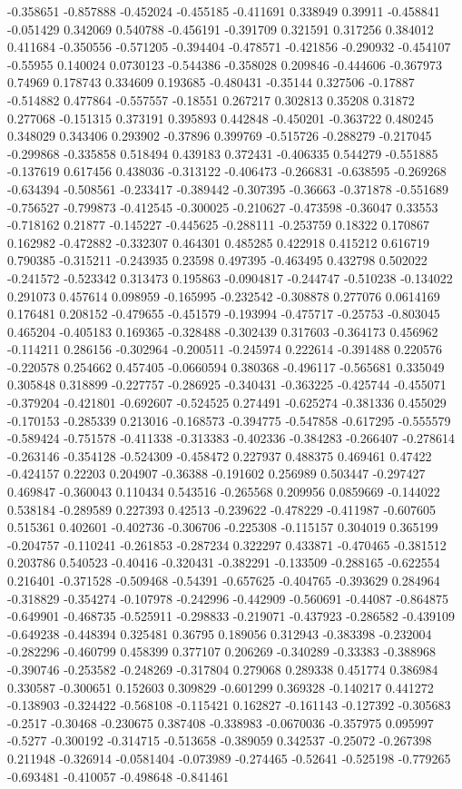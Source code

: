 -0.358651 -0.857888 -0.452024 -0.455185 -0.411691 0.338949 0.39911 -0.458841 -0.051429 0.342069 0.540788 -0.456191 -0.391709 0.321591 0.317256 0.384012 0.411684 -0.350556 -0.571205 -0.394404 -0.478571 -0.421856 -0.290932 -0.454107 -0.55955 0.140024 0.0730123 -0.544386 -0.358028 0.209846 -0.444606 -0.367973 0.74969 0.178743 0.334609 0.193685 -0.480431 -0.35144 0.327506 -0.17887 -0.514882 0.477864 -0.557557 -0.18551 0.267217 0.302813 0.35208 0.31872 0.277068 -0.151315 0.373191 0.395893 0.442848 -0.450201 -0.363722 0.480245 0.348029 0.343406 0.293902 -0.37896 0.399769 -0.515726 -0.288279 -0.217045 -0.299868 -0.335858 0.518494 0.439183 0.372431 -0.406335 0.544279 -0.551885 -0.137619 0.617456 0.438036 -0.313122 -0.406473 -0.266831 -0.638595 -0.269268 -0.634394 -0.508561 -0.233417 -0.389442 -0.307395 -0.36663 -0.371878 -0.551689 -0.756527 -0.799873 -0.412545 -0.300025 -0.210627 -0.473598 -0.36047 0.33553 -0.718162 0.21877 -0.145227 -0.445625 -0.288111 -0.253759 0.18322 0.170867 0.162982 -0.472882 -0.332307 0.464301 0.485285 0.422918 0.415212 0.616719 0.790385 -0.315211 -0.243935 0.23598 0.497395 -0.463495 0.432798 0.502022 -0.241572 -0.523342 0.313473 0.195863 -0.0904817 -0.244747 -0.510238 -0.134022 0.291073 0.457614 0.098959 -0.165995 -0.232542 -0.308878 0.277076 0.0614169 0.176481 0.208152 -0.479655 -0.451579 -0.193994 -0.475717 -0.25753 -0.803045 0.465204 -0.405183 0.169365 -0.328488 -0.302439 0.317603 -0.364173 0.456962 -0.114211 0.286156 -0.302964 -0.200511 -0.245974 0.222614 -0.391488 0.220576 -0.220578 0.254662 0.457405 -0.0660594 0.380368 -0.496117 -0.565681 0.335049 0.305848 0.318899 -0.227757 -0.286925 -0.340431 -0.363225 -0.425744 -0.455071 -0.379204 -0.421801 -0.692607 -0.524525 0.274491 -0.625274 -0.381336 0.455029 -0.170153 -0.285339 0.213016 -0.168573 -0.394775 -0.547858 -0.617295 -0.555579 -0.589424 -0.751578 -0.411338 -0.313383 -0.402336 -0.384283 -0.266407 -0.278614 -0.263146 -0.354128 -0.524309 -0.458472 0.227937 0.488375 0.469461 0.47422 -0.424157 0.22203 0.204907 -0.36388 -0.191602 0.256989 0.503447 -0.297427 0.469847 -0.360043 0.110434 0.543516 -0.265568 0.209956 0.0859669 -0.144022 0.538184 -0.289589 0.227393 0.42513 -0.239622 -0.478229 -0.411987 -0.607605 0.515361 0.402601 -0.402736 -0.306706 -0.225308 -0.115157 0.304019 0.365199 -0.204757 -0.110241 -0.261853 -0.287234 0.322297 0.433871 -0.470465 -0.381512 0.203786 0.540523 -0.40416 -0.320431 -0.382291 -0.133509 -0.288165 -0.622554 0.216401 -0.371528 -0.509468 -0.54391 -0.657625 -0.404765 -0.393629 0.284964 -0.318829 -0.354274 -0.107978 -0.242996 -0.442909 -0.560691 -0.44087 -0.864875 -0.649901 -0.468735 -0.525911 -0.298833 -0.219071 -0.437923 -0.286582 -0.439109 -0.649238 -0.448394 0.325481 0.36795 0.189056 0.312943 -0.383398 -0.232004 -0.282296 -0.460799 0.458399 0.377107 0.206269 -0.340289 -0.33383 -0.388968 -0.390746 -0.253582 -0.248269 -0.317804 0.279068 0.289338 0.451774 0.386984 0.330587 -0.300651 0.152603 0.309829 -0.601299 0.369328 -0.140217 0.441272 -0.138903 -0.324422 -0.568108 -0.115421 0.162827 -0.161143 -0.127392 -0.305683 -0.2517 -0.30468 -0.230675 0.387408 -0.338983 -0.0670036 -0.357975 0.095997 -0.5277 -0.300192 -0.314715 -0.513658 -0.389059 0.342537 -0.25072 -0.267398 0.211948 -0.326914 -0.0581404 -0.073989 -0.274465 -0.52641 -0.525198 -0.779265 -0.693481 -0.410057 -0.498648 -0.841461 